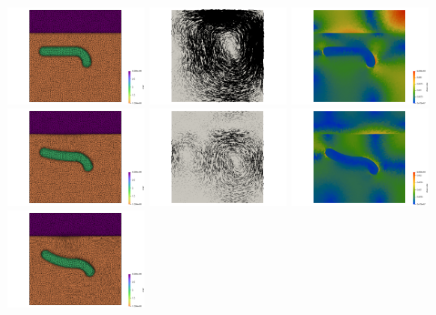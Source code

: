 \begin{center}
\includegraphics[width=4cm]{python_codes/fieldstone_93/results_exp5/mesh000}
\includegraphics[width=4cm]{python_codes/fieldstone_93/results_exp5/vel000}
\includegraphics[width=4cm]{python_codes/fieldstone_93/results_exp5/sr000}\\
\includegraphics[width=4cm]{python_codes/fieldstone_93/results_exp5/mesh100}
\includegraphics[width=4cm]{python_codes/fieldstone_93/results_exp5/vel100}
\includegraphics[width=4cm]{python_codes/fieldstone_93/results_exp5/sr200}\\
\includegraphics[width=4cm]{python_codes/fieldstone_93/results_exp5/mesh200}

\end{center}
